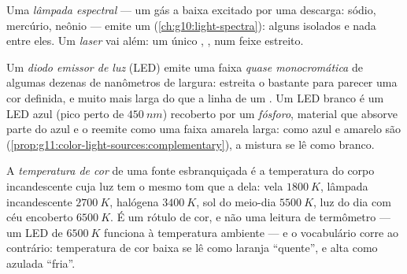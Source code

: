 \begin{definition}\label{def:g11:color-light-sources:lamps}
Uma \emph{lâmpada espectral} --- um gás a baixa
 excitado por uma descarga: sódio, mercúrio, neônio --- emite um
 (\cref{ch:g10:light-spectra}): alguns  isolados e nada entre eles. Um \emph{laser} vai além:
um único , , num feixe estreito.
\end{definition}

\begin{definition}[LEDs]\label{def:g11:color-light-sources:led}
Um \emph{diodo emissor de luz} (LED) emite
uma faixa \emph{quase monocromática} de
algumas dezenas de nanômetros de largura: estreita o bastante para
parecer uma cor definida, e muito mais larga do que a linha de um .
Um LED branco é um LED azul (pico perto de $\qty{450}{nm}$) recoberto por
um \emph{fósforo}, material que absorve parte do azul e o
reemite como uma faixa amarela larga: como azul e amarelo são
 (\cref{prop:g11:color-light-sources:complementary}), a
mistura se lê como branco.
\end{definition}

\begin{definition}\label{def:g11:color-light-sources:colortemp}
A \emph{temperatura de cor} de uma fonte
esbranquiçada é a temperatura do corpo incandescente cuja luz tem o mesmo
tom que a dela: vela $\qty{1800}{K}$, lâmpada incandescente
$\qty{2700}{K}$, halógena $\qty{3400}{K}$, sol do meio-dia
$\qty{5500}{K}$, luz do dia com céu encoberto $\qty{6500}{K}$. É um
rótulo de cor, e não uma leitura de termômetro --- um LED de
$\qty{6500}{K}$ funciona à temperatura ambiente --- e o vocabulário corre
ao contrário: temperatura de cor baixa se lê como laranja ``quente'', e
alta como azulada ``fria''.
\end{definition}

